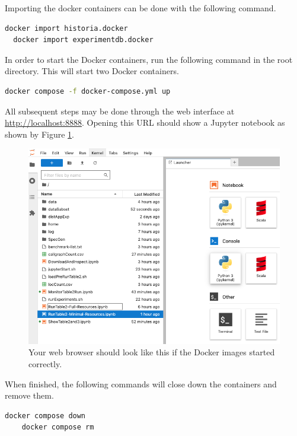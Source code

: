 \documentclass{acmart} %
\begin{document}
Importing the docker containers can be done with the following command.

\begin{lstlisting}[language=bash]
  docker import historia.docker
  docker import experimentdb.docker
\end{lstlisting}

In order to start the Docker containers, run the following command in the root directory.  This will start two Docker containers.

\begin{lstlisting}[language=bash]
 docker compose -f docker-compose.yml up
\end{lstlisting}

All subsequent steps may be done through the web interface at \url{http://localhost:8888}.  Opening this URL should show a Jupyter notebook as shown by Figure \ref{fig:jupyter}.  


\begin{figure}[H]
    \includegraphics*[scale=0.35]{jupyter.png}
    \caption{Your web browser should look like this if the Docker images started correctly.}
    \label{fig:jupyter}
\end{figure}

When finished, the following commands will close down the containers and remove them.

\begin{lstlisting}[language=bash]
    docker compose down
    docker compose rm
\end{lstlisting}
\end{document}
